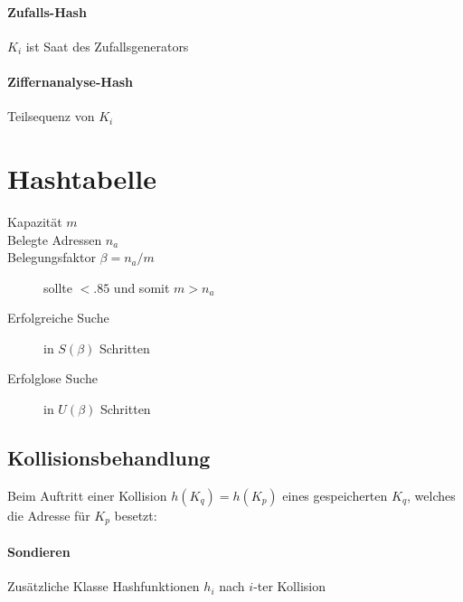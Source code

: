 \paragraph{Zufalls-Hash} $K_i$ ist Saat des Zufallsgenerators

\paragraph{Ziffernanalyse-Hash} Teilsequenz von $K_i$

\section{Hashtabelle}

\begin{description}
  \item[Kapazität $m$]
  \item[Belegte Adressen $n_a$]
  \item[Belegungsfaktor $\beta = n_a / m$]
    sollte $<.85$ und somit $m > n_a$
  \item[Erfolgreiche Suche] in $S(\beta)$ Schritten
  \item[Erfolglose Suche] in $U(\beta)$ Schritten
\end{description}

\subsection{Kollisionsbehandlung}

Beim Auftritt einer Kollision $h(K_q) = h(K_p)$ eines gespeicherten $K_q$, welches die Adresse für $K_p$ besetzt:

\paragraph{Sondieren}
Zusätzliche Klasse Hashfunktionen $h_i$ nach $i$-ter Kollision

